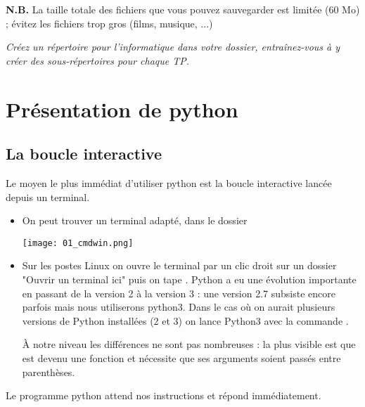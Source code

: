{\bf N.B.} La taille totale des fichiers que vous pouvez sauvegarder est limitée (60 Mo) ; évitez les fichiers trop gros (films, musique, ...)

{\it Créez un répertoire pour l'informatique dans votre dossier, entraînez-vous à y créer des sous-répertoires pour chaque TP.}

\section{Présentation de python}
\subsection{La boucle interactive}
Le moyen le plus immédiat d'utiliser python est la boucle interactive lancée depuis un terminal.
\begin{itemize}

\item On peut trouver un terminal adapté,  dans le dossier 
\begin{center}
\texttt{[image: 01\_cmdwin.png]} 
\end{center}
\item Sur les postes Linux on ouvre le terminal par un clic droit sur un dossier "Ouvrir un terminal ici" puis on tape . Python a eu une évolution importante en passant de la version 2 à la version 3 : une version 2.7 subsiste encore parfois mais nous utiliserons python3. Dans le cas où on aurait plusieurs versions de Python installées (2 et 3) on lance Python3 avec la commande .

À notre niveau les différences ne sont pas nombreuses : la plus visible est que  est devenu une fonction et nécessite que ses arguments soient passés entre parenthèses.

\end{itemize}
Le programme python attend nos instructions et répond immédiatement.

